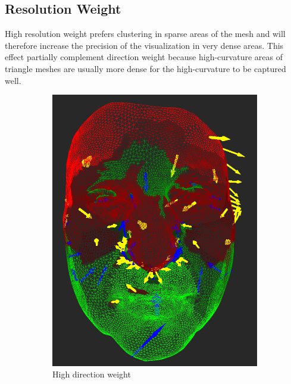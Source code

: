 \subsection{Resolution Weight}

High resolution weight prefers clustering in sparse areas of the mesh and will therefore increase the precision of the visualization in very dense areas. This effect partially complement direction weight because high-curvature areas of triangle meshes are usually more dense for the high-curvature to be captured well.

\begin{figure}[h]
\centering
	\begin{subfigure}{0.3\textwidth}
	\includegraphics[width=\textwidth]{./img/meshdiff-high_direction.PNG}
	\caption{High direction weight}
	\label{fig:meshdiff_high_direction}
	\end{subfigure}
    \qquad
    \begin{subfigure}{0.3\textwidth}

\end{subfigure}
\end{figure}
